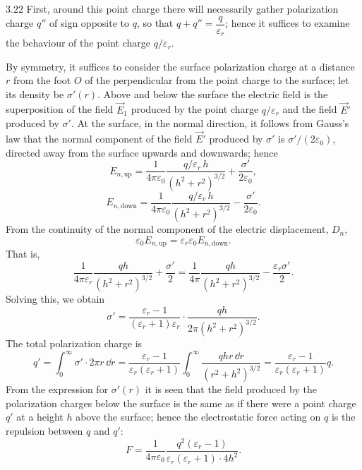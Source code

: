 \begin{solution}{3.22}
First, around this point charge there will necessarily gather polarization charge $q''$ of sign opposite to $q$, so that $q+q''=\dfrac{q}{\varepsilon_r}$; hence it suffices to examine the behaviour of the point charge $q/\varepsilon_r$.

By symmetry, it suffices to consider the surface polarization charge at a distance $r$ from the foot $O$ of the perpendicular from the point charge to the surface; let its density be $\sigma'(r)$. Above and below the surface the electric field is the superposition of the field $\vec{E}_1$ produced by the point charge $q/\varepsilon_r$ and the field $\vec{E}'$ produced by $\sigma'$. At the surface, in the normal direction, it follows from Gauss's law that the normal component of the field $\vec{E}'$ produced by $\sigma'$ is $\sigma'/(2\varepsilon_0)$, directed away from the surface upwards and downwards; hence
\[
E_{n,\text{up}}=\frac{1}{4\pi\varepsilon_0}\frac{q/\varepsilon_r\,h}{(h^2+r^2)^{3/2}}+\frac{\sigma'}{2\varepsilon_0},
\]
\[
E_{n,\text{down}}=\frac{1}{4\pi\varepsilon_0}\frac{q/\varepsilon_r\,h}{(h^2+r^2)^{3/2}}-\frac{\sigma'}{2\varepsilon_0}.
\]
From the continuity of the normal component of the electric displacement, $D_n$,
\[
\varepsilon_0E_{n,\text{up}}=\varepsilon_r\varepsilon_0E_{n,\text{down}}.
\]
That is,
\[
\frac{1}{4\pi\varepsilon_r}\frac{qh}{(h^2+r^2)^{3/2}}+\frac{\sigma'}{2}
=\frac{1}{4\pi}\frac{qh}{(h^2+r^2)^{3/2}}-\frac{\varepsilon_r\sigma'}{2}.
\]
Solving this, we obtain
\[
\sigma'=\frac{\varepsilon_r-1}{(\varepsilon_r+1)\varepsilon_r}\cdot
\frac{qh}{2\pi(h^2+r^2)^{3/2}}.
\]
The total polarization charge is
\[
q'=\int_0^\infty\sigma'\cdot2\pi r\,\dd r
=\frac{\varepsilon_r-1}{\varepsilon_r(\varepsilon_r+1)}
\int_0^\infty\frac{qhr\,\dd r}{(r^2+h^2)^{3/2}}
=\frac{\varepsilon_r-1}{\varepsilon_r(\varepsilon_r+1)}q.
\]
From the expression for $\sigma'(r)$ it is seen that the field produced by the polarization charges below the surface is the same as if there were a point charge $q'$ at a height $h$ above the surface; hence the electrostatic force acting on $q$ is the repulsion between $q$ and $q'$:
\[
F=\frac{1}{4\pi\varepsilon_0}\frac{q^2(\varepsilon_r-1)}{\varepsilon_r(\varepsilon_r+1)\cdot4h^2}.
\]


\end{solution}
